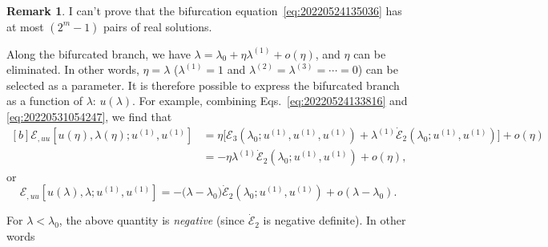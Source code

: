 \documentclass[12pt, final]{scrartcl}
\theoremstyle{definition}
\newtheorem{remark}{Remark}
\newcommand{\E}{\mathcal E}
\newcommand{\order}[2][1]{#2^{(#1)}}
\begin{document}
\begin{remark}
  I can't prove that the bifurcation equation~\eqref{eq:20220524135036} has at most $(2^m - 1)$ pairs of real solutions.
\end{remark}

Along the bifurcated branch, we have $\lambda = \lambda_0 + \eta \order[1]\lambda + o(\eta)$, and $\eta$ can be
eliminated. In other words, $\eta=\lambda$ ($\order[1]\lambda=1$ and $\order[2]\lambda = \order[3]\lambda = \cdots = 0$)
can be selected as a parameter. It is therefore possible to express the bifurcated branch as a function of $\lambda$:
$u(\lambda)$. For example, combining Eqs.~\eqref{eq:20220524133816} and \eqref{eq:20220531054247}, we find that
\begin{equation}
  \begin{aligned}[b]
    \E_{, uu}[u(\eta), \lambda(\eta); \order[1]u, \order[1]u]
    &= \eta \bigl[\E_3(\lambda_0 ; \order[1]u, \order[1]u, \order[1]u)  + \order[1]\lambda \dot{\E}_2(\lambda_0; \order[1]u, \order[1]u)\bigr] + o(\eta)\\
    &= - \eta \order[1]\lambda \dot{\E}_2(\lambda_0; \order[1]u, \order[1]u) + o(\eta),
  \end{aligned}
\end{equation}
or
\begin{equation}
  \label{eq:20220819160235}
  \E_{, uu}[u(\lambda), \lambda; \order[1]u, \order[1]u] = -\bigl( \lambda - \lambda_0 \bigr) \dot{\E}_2(\lambda_0; \order[1]u, \order[1]u) + o(\lambda - \lambda_0).
\end{equation}

For $\lambda < \lambda_0$, the above quantity is \emph{negative} (since $\dot{\E}_2$ is negative definite). In other
words

\begin{center}
\end{center}
\end{document}
